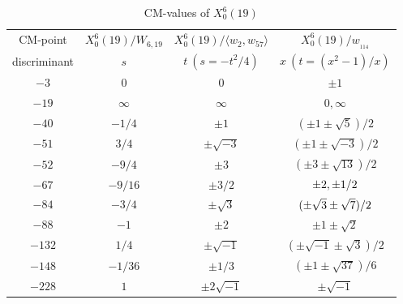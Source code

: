 \documentclass{amsart}
\theoremstyle{definition}
\begin{document}
\begin{appendices}
\renewcommand{\arraystretch}{1.5}
\tabcolsep=10pt                         
\begin{table}
\begin{tabular}{|c|c|c|c|}
\hline
CM-point& $X_{0}^{6}\left( 19\right) /W_{6,19}$ & $X_{0}^{6}\left( 19\right)
/\langle w_2,w_{57} \rangle$ & $X_{0}^{6}\left( 19\right) /w_{_{114}}$ \\ 
discriminant & $s$ & $t\ (s=-t^2/{4})$ & $x\ (t=(x^2-1)/{x})$ \\ \hline
${-3}$ & $0$ & $0$ & $\pm 1$ \\ 
${-19}$ & $\infty $ & $\infty $ & $0,\infty $ \\
${-40}$ & $-{1}/{4}$ & $\pm1$ & $(\pm 1\pm \sqrt{5})
/{2}$ \\ 
${-51}$ & ${3}/{4}$ & $\pm\sqrt{-3}$ & $(\pm 1\pm 
\sqrt{-3})/{2}$ \\ 
${-52}$ & $-{9}/{4}$ & $\pm3$ & $(\pm 3\pm 
\sqrt{13})/{2}$ \\ 
${-67}$ & $-{9}/{16}$ & $\pm{ 3}/{2}$ & $\pm 2,\pm{ 1}/{%
2}$ \\
${-84}$ & $-{3}/{4}$ & $\pm\sqrt{3}$ & $(\pm \sqrt{%
3}\pm \sqrt{7})/{2}$ \\
${-88}$ & $-1$ & $\pm 2$ & $\pm 1\pm \sqrt{2}$ \\ 
${-132}$ & ${1}/{4}$ & $\pm\sqrt{-1}$ & $(\pm \sqrt{-1}\pm \sqrt{3})/{2}$ \\
${-148}$ & $-{1}/{36}$ & $\pm{ 1}/{3}$ & $%
(\pm 1\pm \sqrt{37})/{6}$ \\ 
${-228}$ & $1$ & $\pm 2\sqrt{-1}$ & $\pm \sqrt{-1}$ \\ \hline
\end{tabular}
\bigskip
\caption{CM-values of $X^{6}_0(19)$}




\end{table}
\end{appendices}
\end{document}
